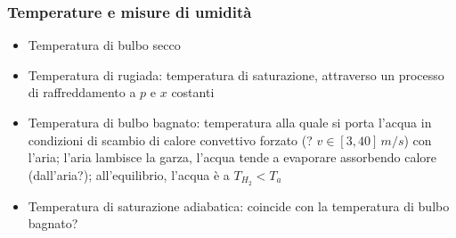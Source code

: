 \documentclass[letterpaper,10pt,italian]{jupyterBook}
\begin{document}
\subsubsection{Temperature e misure di umidità}
\label{\detokenize{ch/thermodynamics/humid-air:temperature-e-misure-di-umidita}}\begin{itemize}
\item {} 
\sphinxAtStartPar
Temperatura di bulbo secco

\item {} 
\sphinxAtStartPar
Temperatura di rugiada: temperatura di saturazione, attraverso un processo di raffreddamento a \(p\) e \(x\) costanti

\item {} 
\sphinxAtStartPar
Temperatura di bulbo bagnato: temperatura alla quale si porta l’acqua in condizioni di scambio di calore convettivo forzato (? \(v \in [3, 40] \, m/s\)) con l’aria; l’aria lambisce la garza, l’acqua tende a evaporare assorbendo calore (dall’aria?); all’equilibrio, l’acqua è a \(T_{H_2} < T_{a}\)

\item {} 
\sphinxAtStartPar
Temperatura di saturazione adiabatica: coincide con la temperatura di bulbo bagnato?

\end{itemize}
\end{document}
